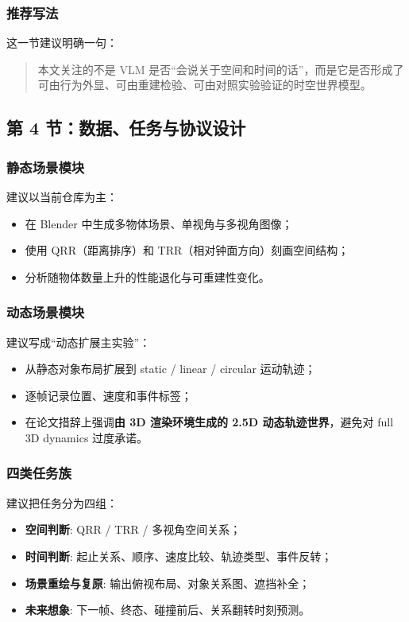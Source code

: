 \documentclass[UTF8,12pt,fontset=none]{ctexart}
\begin{document}
\subsubsection{推荐写法}
这一节建议明确一句：
\begin{quote}
本文关注的不是 VLM 是否“会说关于空间和时间的话”，而是它是否形成了可由行为外显、可由重建检验、可由对照实验验证的时空世界模型。
\end{quote}

\subsection{第 4 节：数据、任务与协议设计}

\subsubsection{静态场景模块}
建议以当前仓库为主：
\begin{itemize}
  \item 在 Blender 中生成多物体场景、单视角与多视角图像；
  \item 使用 QRR（距离排序）和 TRR（相对钟面方向）刻画空间结构；
  \item 分析随物体数量上升的性能退化与可重建性变化。
\end{itemize}

\subsubsection{动态场景模块}
建议写成“动态扩展主实验”：
\begin{itemize}
  \item 从静态对象布局扩展到 static / linear / circular 运动轨迹；
  \item 逐帧记录位置、速度和事件标签；
  \item 在论文措辞上强调\textbf{由 3D 渲染环境生成的 2.5D 动态轨迹世界}，避免对 full 3D dynamics 过度承诺。
\end{itemize}

\subsubsection{四类任务族}
建议把任务分为四组：
\begin{itemize}
  \item \textbf{空间判断}: QRR / TRR / 多视角空间关系；
  \item \textbf{时间判断}: 起止关系、顺序、速度比较、轨迹类型、事件反转；
  \item \textbf{场景重绘与复原}: 输出俯视布局、对象关系图、遮挡补全；
  \item \textbf{未来想象}: 下一帧、终态、碰撞前后、关系翻转时刻预测。
\end{itemize}
\end{document}
